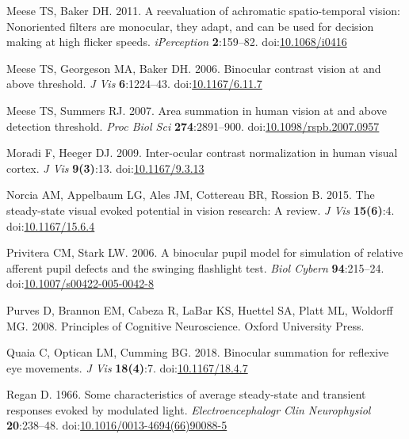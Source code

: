 \documentclass[
]{article}
\newlength{\cslhangindent}
\newlength{\cslentryspacingunit} %
\newenvironment{CSLReferences}[2] %
 {%
  \setlength{\parindent}{0pt}
  \ifodd #1
  \let\oldpar\par
  \def\par{\hangindent=\cslhangindent\oldpar}
  \fi
  \setlength{\parskip}{#2\cslentryspacingunit}
 }%
 {}
\begin{document}
\begin{CSLReferences}{1}{0}
\leavevmode{}%
Meese TS, Baker DH. 2011. A reevaluation of achromatic spatio-temporal vision: Nonoriented filters are monocular, they adapt, and can be used for decision making at high flicker speeds. \emph{{iPerception}} \textbf{2}:159--82. doi:\href{https://doi.org/10.1068/i0416}{10.1068/i0416}

\leavevmode{}%
Meese TS, Georgeson MA, Baker DH. 2006. Binocular contrast vision at and above threshold. \emph{J Vis} \textbf{6}:1224--43. doi:\href{https://doi.org/10.1167/6.11.7}{10.1167/6.11.7}

\leavevmode{}%
Meese TS, Summers RJ. 2007. Area summation in human vision at and above detection threshold. \emph{Proc Biol Sci} \textbf{274}:2891--900. doi:\href{https://doi.org/10.1098/rspb.2007.0957}{10.1098/rspb.2007.0957}

\leavevmode{}%
Moradi F, Heeger DJ. 2009. Inter-ocular contrast normalization in human visual cortex. \emph{J Vis} \textbf{9(3)}:13. doi:\href{https://doi.org/10.1167/9.3.13}{10.1167/9.3.13}

\leavevmode{}%
Norcia AM, Appelbaum LG, Ales JM, Cottereau BR, Rossion B. 2015. The steady-state visual evoked potential in vision research: A review. \emph{J Vis} \textbf{15(6)}:4. doi:\href{https://doi.org/10.1167/15.6.4}{10.1167/15.6.4}

\leavevmode{}%
Privitera CM, Stark LW. 2006. A binocular pupil model for simulation of relative afferent pupil defects and the swinging flashlight test. \emph{Biol Cybern} \textbf{94}:215--24. doi:\href{https://doi.org/10.1007/s00422-005-0042-8}{10.1007/s00422-005-0042-8}

\leavevmode{}%
Purves D, Brannon EM, Cabeza R, LaBar KS, Huettel SA, Platt ML, Woldorff MG. 2008. Principles of {Cognitive} {Neuroscience}. Oxford University Press.

\leavevmode{}%
Quaia C, Optican LM, Cumming BG. 2018. Binocular summation for reflexive eye movements. \emph{J Vis} \textbf{18(4)}:7. doi:\href{https://doi.org/10.1167/18.4.7}{10.1167/18.4.7}

\leavevmode{}%
Regan D. 1966. Some characteristics of average steady-state and transient responses evoked by modulated light. \emph{Electroencephalogr Clin Neurophysiol} \textbf{20}:238--48. doi:\href{https://doi.org/10.1016/0013-4694(66)90088-5}{10.1016/0013-4694(66)90088-5}


\end{CSLReferences}
\end{document}
